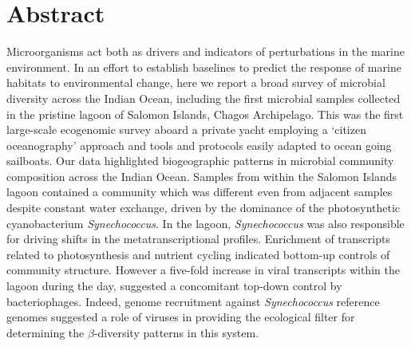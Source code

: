 \section{Abstract}

Microorganisms act both as drivers and indicators of perturbations in the marine environment. In an effort to establish baselines to predict the response of marine habitats to environmental change, here we report a broad survey of microbial diversity across the Indian Ocean, including the first microbial samples collected in the pristine lagoon of Salomon Islands, Chagos Archipelago. This was the first large-scale ecogenomic survey aboard a private yacht employing a `citizen oceanography' approach and tools and protocols easily adapted to ocean going sailboats. Our data highlighted biogeographic patterns in microbial community composition across the Indian Ocean. Samples from within the Salomon Islands lagoon contained a community which was different even from adjacent samples despite constant water exchange, driven by the dominance of the photosynthetic cyanobacterium {\em Synechococcus}. In the lagoon, {\em Synechococcus} was also responsible for driving shifts in the metatranscriptional profiles. Enrichment of transcripts related to photosynthesis and nutrient cycling indicated bottom-up controls of community structure. However a five-fold increase in viral transcripts within the lagoon during the day, suggested a concomitant top-down control by bacteriophages. Indeed, genome recruitment against {\em Synechococcus} reference genomes suggested a role of viruses in providing the ecological filter for determining the $\beta$-diversity patterns in this system.